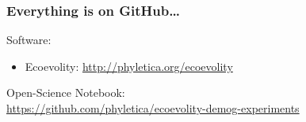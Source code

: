 \begin{frame}
    \frametitle{Everything is on GitHub\ldots}
    Software:\\
    \begin{itemize}
        \item Ecoevolity: \url{http://phyletica.org/ecoevolity}
    \end{itemize}

    \medskip
    Open-Science Notebook:\\

    \url{https://github.com/phyletica/ecoevolity-demog-experiments}
\end{frame}

